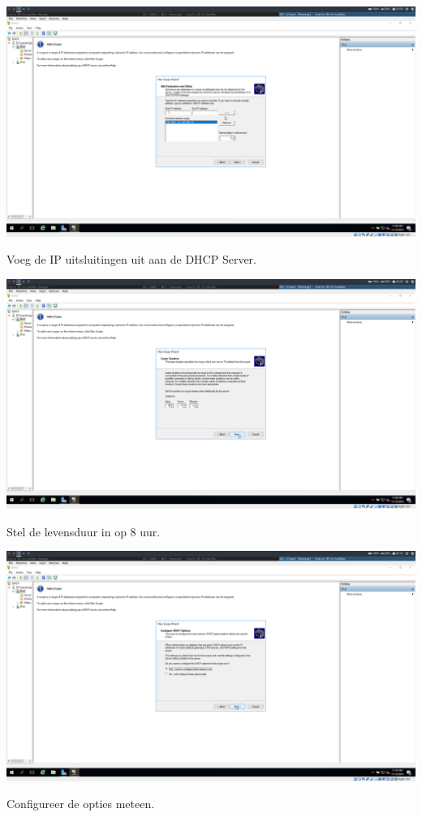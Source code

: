 \documentclass[a4paper]{article}
\begin{document}
\begin{center}
	\includegraphics[width=15cm]{Pictures/DC2/DHCP/1542308975.png}
	
	Voeg de IP uitsluitingen uit aan de DHCP Server.
\end{center}
\begin{center}
	\includegraphics[width=15cm]{Pictures/DC2/DHCP/1542308991.png}
	
	Stel de levensduur in op 8 uur.
\end{center}
\begin{center}
	\includegraphics[width=15cm]{Pictures/DC2/DHCP/1542309046.png}
	
	Configureer de opties meteen.
\end{center}
\end{document}
